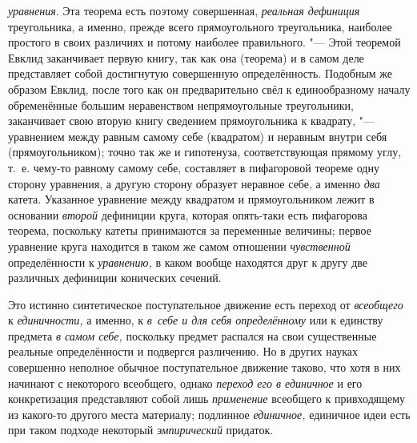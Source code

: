 {\em уравнения}. Эта
теорема есть поэтому совершенная,
{\em реальная дефиниция}
треугольника, а именно, прежде всего прямоугольного
треугольника, наиболее простого в своих различиях и потому наиболее
правильного. "--- Этой теоремой Евклид заканчивает первую
книгу, так как она (теорема) и в самом деле представляет собой достигнутую
совершенную определённость. Подобным же образом Евклид, после того как он
предварительно свёл к единообразному
началу
обременённые большим неравенством непрямоугольные
треугольники, заканчивает свою вторую книгу сведением прямоугольника к
квадрату, "--- уравнением между равным самому себе (квадратом)
и
неравным внутри себя (прямоугольником); точно так же и
гипотенуза, соответствующая прямому углу, т.~е. чему-то равному самому
себе, составляет в пифагоровой теореме одну сторону уравнения, а другую
сторону образует неравное себе, а именно
{\em два} катета.
Указанное уравнение между квадратом и прямоугольником лежит в основании
{\em второй} дефиниции
круга, которая опять-таки есть пифагорова теорема, поскольку катеты
принимаются за переменные величины; первое уравнение круга находится в
таком же самом отношении
{\em чувственной}
определённости к
{\em уравнению,} в каком
вообще находятся друг к другу две различных дефиниции конических сечений.

Это истинно синтетическое поступательное движение есть переход
от {\em всеобщего} к
{\em единичности,} а
именно, к {\em в~себе и для себя
определённому} или к единству предмета
{\em в самом себе,}
поскольку предмет распался на свои существенные реальные
определённости и подвергся различению. Но в других науках совершенно
неполное обычное поступательное движение таково, что хотя в них начинают с
некоторого всеобщего, однако
{\em переход его в единичное}
и его конкретизация представляют собой лишь
{\em применение}
всеобщего к привходящему из какого-то другого места
материалу; подлинное {\em единичное,}
единичное идеи есть при таком подходе некоторый
{\em эмпирический} придаток.

